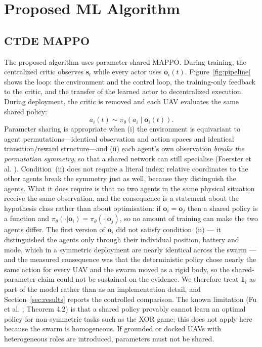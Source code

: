 \documentclass[conference]{IEEEtran}
\begin{document}
\section{Proposed ML Algorithm}
\label{sec:algorithm}

\subsection{CTDE MAPPO}
\label{sec:mappo}
The proposed algorithm uses parameter-shared MAPPO. During training, the centralized critic observes $\mathbf s_t$ while every actor uses $\mathbf o_i(t)$. Figure~\ref{fig:pipeline} shows the loop: the environment and the control loop, the training-only feedback to the critic, and the transfer of the learned actor to decentralized execution. During deployment, the critic is removed and each UAV evaluates the same shared policy:
\begin{equation}
a_i(t)\sim\pi_{\theta}\left(a_i\mid\mathbf o_i(t)\right).
\label{eq:policy}
\end{equation}
Parameter sharing is appropriate when (i) the environment is equivariant to agent permutations---identical observation and action spaces and identical transition/reward structure---and (ii) each agent's own observation \emph{breaks the permutation symmetry}, so that a shared network can still specialise (Foerster et al. \cite{foerster2016}). Condition~(ii) does not require a literal index: relative coordinates to the other agents break the symmetry just as well, because they distinguish the agents. What it does require is that no two agents in the same physical situation receive the same observation, and the consequence is a statement about the hypothesis class rather than about optimisation: if $\mathbf o_i=\mathbf o_j$ then a shared policy is a function and $\pi_\theta(\cdot|\mathbf o_i)=\pi_\theta(\cdot|\mathbf o_j)$, so no amount of training can make the two agents differ. The first version of $\mathbf o_i$ did not satisfy condition~(ii) --- it distinguished the agents only through their individual position, battery and mode, which in a symmetric deployment are nearly identical across the swarm --- and the measured consequence was that the deterministic policy chose nearly the same action for every UAV and the swarm moved as a rigid body, so the shared-parameter claim could not be sustained on the evidence. We therefore treat $\mathbf 1_i$ as part of the model rather than as an implementation detail, and Section~\ref{sec:results} reports the controlled comparison. The known limitation (Fu et al. \cite{fu2022}, Theorem 4.2) is that a shared policy provably cannot learn an optimal policy for non-symmetric tasks such as the XOR game; this does not apply here because the swarm is homogeneous. If grounded or docked UAVs with heterogeneous roles are introduced, parameters must not be shared.
\end{document}
